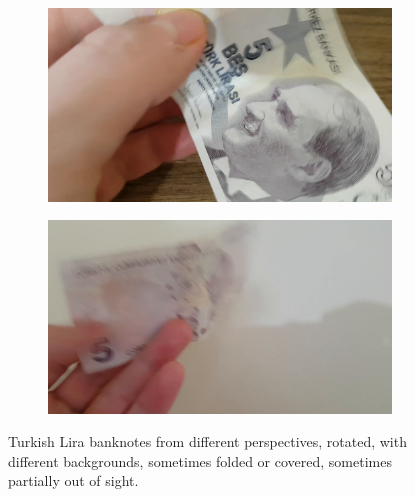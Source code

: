 \documentclass{article}
\begin{document}
\begin{figure}[h]
    \begin{subfigure}[b]{0.45\textwidth}
        \centering
        \includegraphics[width=\textwidth]{5_3}
    \end{subfigure}
    \begin{subfigure}[b]{0.45\textwidth}
        \centering
        \includegraphics[width=\textwidth]{5_4}
    \end{subfigure}
    \caption{Turkish Lira banknotes from different perspectives, rotated, with different backgrounds, sometimes folded or covered, sometimes partially out of sight.}
    \label{fig:bankonote_5}
\end{figure}
\end{document}
